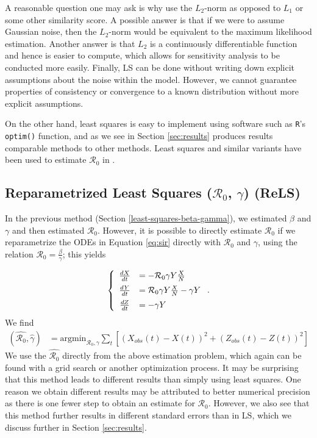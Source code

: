 \documentclass[12pt]{article}
\newcommand{\rr}{\ensuremath{\mathcal{R}_0}}
\begin{document}
A reasonable question one may ask is why use the $L_2$-norm as opposed to $L_1$ or some other similarity score.  A possible answer is that if we were to assume Gaussian noise, then the $L_2$-norm would be equivalent to the maximum likelihood estimation.  Another answer is that $L_2$ is a continuously differentiable function and hence is easier to compute, which allows for sensitivity analysis to  be conducted more easily.  Finally, LS can be done without writing down explicit assumptions about the noise within the model.  However, we cannot guarantee properties of consistency or convergence to a known distribution without more explicit assumptions.  

On the other hand, least squares is easy to implement using software such as \texttt{R}'s \texttt{optim()} function, and as we see in Section \ref{sec:results} produces results comparable methods to other methods.  Least squares and similar variants have been used to estimate $\rr$ in \cite{majumder2016}.

\subsection{Reparametrized Least Squares ($\rr$, $\gamma$) (ReLS)}\label{reparametrized-least-squares-rux5f0-gamma}

In the previous method (Section \ref{least-squares-beta-gamma}), we estimated $\beta$ and $\gamma$ and then estimated $\rr$.  However, it is possible to directly estimate $\rr$ if we reparametrize the ODEs in Equation \eqref{eq:sir} directly with \(\rr\) and \(\gamma\), using the relation $\rr = \frac{\beta}{\gamma}$; this yields

\begin{align*}
  \left \{
  \begin{array}{cl}
    \frac{dX}{dt} &= - \rr \gamma Y \frac{X}{N}\vspace{.5em}\\
    \frac{dY}{dt} &=  \rr \gamma Y \frac{X}{N}  - \gamma Y\vspace{.5em} \\
    \frac{dZ}{dt} &=  - \gamma Y 
  \end{array}
  \right . .
  \end{align*}
We find
\begin{align*}
(\hat{\rr}, \hat{\gamma} ) &= \text{argmin}_{\rr, \gamma} \sum_{t} \left [ \left (X_{obs}(t) - X(t)\right )^2 + \left ( Z_{obs}(t) - Z(t) \right )^2 \right ]
\end{align*}
We use the $\hat{\rr}$ directly from the above estimation problem, which again can be found with a grid search or another optimization process.  It may be surprising that this method leads to different results than simply using least squares.  One reason we obtain different results may be attributed to better numerical precision as there is one fewer step to obtain an estimate for $\rr$.  However, we also see that this method further results in different standard errors than in LS, which we discuss further in Section \ref{sec:results}.
\end{document}
